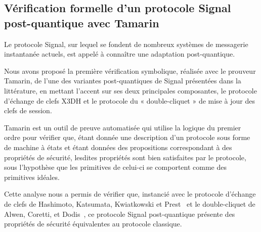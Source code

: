 
\subsection[Second article]{Vérification formelle d’un protocole Signal post-quantique avec Tamarin~\cite{BCRS}} %
\label{sub:paper_2}
Le protocole Signal, sur lequel se fondent de nombreux systèmes de messagerie instantanée actuels, est appelé à connaître une adaptation post-quantique.\par

Nous avons proposé la première vérification symbolique, réalisée avec le prouveur Tamarin, de l’une des variantes post-quantiques de Signal présentées dans la littérature, en mettant l’accent sur ses deux principales composantes, le protocole d’échange de clefs X3DH et le protocole du « double-cliquet » de mise à jour des clefs de session.\par

Tamarin est un outil de preuve automatisée qui utilise la logique du premier ordre pour vérifier que, étant donnée une description d’un protocole sous forme de machine à états et étant données des propositions correspondant à des propriétés de sécurité, lesdites propriétés sont bien satisfaites par le protocole, sous l’hypothèse que les primitives de celui-ci se comportent comme des primitives idéales.\par


Cette analyse nous a permis de vérifier que, instancié avec le protocole d’échange de clefs de Hashimoto, Katsumata, Kwiatkowski et Prest~\cite{PKC:HKKP21} et le double-cliquet de Alwen, Coretti, et Dodis~\cite{EC:AlwCorDod19}, ce protocole Signal post-quantique présente des propriétés de sécurité équivalentes au protocole classique.


